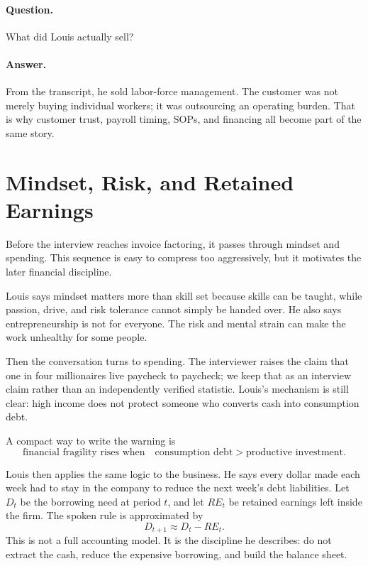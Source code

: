 \paragraph{Question.} What did Louis actually sell?

\paragraph{Answer.} From the transcript, he sold labor-force management. The customer was not merely buying individual workers; it was outsourcing an operating burden. That is why customer trust, payroll timing, SOPs, and financing all become part of the same story.

\section{Mindset, Risk, and Retained Earnings}

Before the interview reaches invoice factoring, it passes through mindset and spending. This sequence is easy to compress too aggressively, but it motivates the later financial discipline.

Louis says mindset matters more than skill set because skills can be taught, while passion, drive, and risk tolerance cannot simply be handed over. He also says entrepreneurship is not for everyone. The risk and mental strain can make the work unhealthy for some people.

Then the conversation turns to spending. The interviewer raises the claim that one in four millionaires live paycheck to paycheck; we keep that as an interview claim rather than an independently verified statistic. Louis's mechanism is still clear: high income does not protect someone who converts cash into consumption debt.

A compact way to write the warning is
\begin{equation}
\text{financial fragility rises when}
\quad
\text{consumption debt} >
\text{productive investment}.
\end{equation}

Louis then applies the same logic to the business. He says every dollar made each week had to stay in the company to reduce the next week's debt liabilities. Let \(D_t\) be the borrowing need at period \(t\), and let \(RE_t\) be retained earnings left inside the firm. The spoken rule is approximated by
\begin{equation}
D_{t+1} \approx D_t - RE_t.
\end{equation}
This is not a full accounting model. It is the discipline he describes: do not extract the cash, reduce the expensive borrowing, and build the balance sheet.

